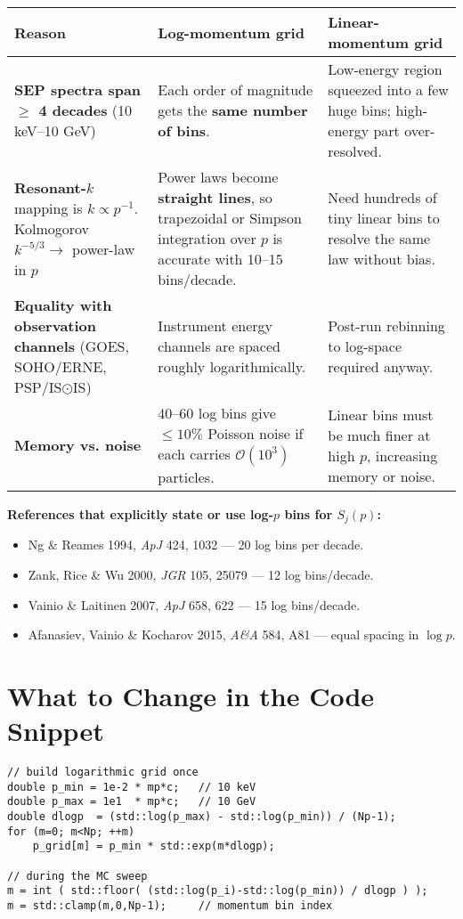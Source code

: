 \begin{tabular}{|p{5.3cm}|p{5.8cm}|p{5.8cm}|}
\hline
\textbf{Reason} & \textbf{Log-momentum grid} & \textbf{Linear-momentum grid} \\
\hline
\textbf{SEP spectra span $\geq$ 4 decades} (10 keV--10 GeV) & Each order of magnitude gets the \textbf{same number of bins}. & Low-energy region squeezed into a few huge bins; high-energy part over-resolved. \\
\hline
\textbf{Resonant-$k$} mapping is $k \propto p^{-1}$. Kolmogorov $k^{-5/3} \rightarrow$ power-law in $p$ & Power laws become \textbf{straight lines}, so trapezoidal or Simpson integration over $p$ is accurate with 10--15 bins/decade. & Need hundreds of tiny linear bins to resolve the same law without bias. \\
\hline
\textbf{Equality with observation channels} (GOES, SOHO/ERNE, PSP/IS$\odot$IS) & Instrument energy channels are spaced roughly logarithmically. & Post-run rebinning to log-space required anyway. \\
\hline
\textbf{Memory vs. noise} & 40--60 log bins give $\leq 10\%$ Poisson noise if each carries $\mathcal{O}(10^3)$ particles. & Linear bins must be much finer at high $p$, increasing memory or noise. \\
\hline
\end{tabular}

\bigskip

\textbf{References that explicitly state or use log-$p$ bins for $S_j(p)$:}
\begin{itemize}
  \item Ng \& Reames 1994, \textit{ApJ} 424, 1032 — 20 log bins per decade.
  \item Zank, Rice \& Wu 2000, \textit{JGR} 105, 25079 — 12 log bins/decade.
  \item Vainio \& Laitinen 2007, \textit{ApJ} 658, 622 — 15 log bins/decade.
  \item Afanasiev, Vainio \& Kocharov 2015, \textit{A\&A} 584, A81 — equal spacing in $\log p$.
\end{itemize}

\bigskip

\section*{What to Change in the Code Snippet}

\begin{verbatim}
// build logarithmic grid once
double p_min = 1e-2 * mp*c;   // 10 keV
double p_max = 1e1  * mp*c;   // 10 GeV
double dlogp  = (std::log(p_max) - std::log(p_min)) / (Np-1);
for (m=0; m<Np; ++m)
    p_grid[m] = p_min * std::exp(m*dlogp);

// during the MC sweep
m = int ( std::floor( (std::log(p_i)-std::log(p_min)) / dlogp ) );
m = std::clamp(m,0,Np-1);     // momentum bin index
\end{verbatim}

